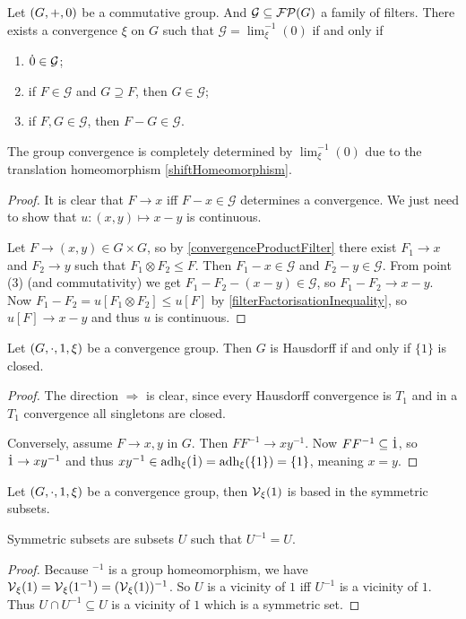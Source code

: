 \begin{proposition} \label{groupConvergenceConstruction}
Let $\left( G, +, 0 \right)$ be a commutative group. And $\mathcal{G} \subseteq \operatorname{\mathcal{FP}}(G)$ a family of filters. There exists a convergence $\xi$ on $G$ such that $\mathcal{G} = \lim^{-1}_\xi(0)$ \textup{if and only if}
\begin{enumerate}
\item $\dot{0} \in \mathcal{G}$;
\item if $F \in \mathcal{G}$ and $G\supseteq F$, then $G\in \mathcal{G}$;
\item if $F,G\in \mathcal{G}$, then $F - G\in \mathcal{G}$.
\end{enumerate}
\end{proposition}
The group convergence is completely determined by $\lim^{-1}_\xi(0)$ due to the translation homeomorphism \ref{shiftHomeomorphism}.
\begin{proof}
It is clear that $F \to x$ iff $F - x \in \mathcal{G}$ determines a convergence. We just need to show that $u: (x,y) \mapsto x - y$ is continuous.

Let $F \to (x,y) \in G\times G$, so by \ref{convergenceProductFilter} there exist $F_1\to x$ and $F_2 \to y$ such that $F_1\otimes F_2 \leq F$. Then $F_1 - x \in \mathcal{G}$ and $F_2 - y \in \mathcal{G}$. From point (3) (and commutativity) we get $F_1 - F_2 - (x - y) \in \mathcal{G}$, so $F_1 - F_2 \to x-y$. Now $F_1 - F_2 = u[F_1\otimes F_2] \leq u[F]$ by \ref{filterFactorisationInequality}, so $u[F] \to x-y$ and thus $u$ is continuous.
\end{proof}

\begin{proposition} \label{HausdorffCriterionConvergenceGroup}
Let $\left( G,\cdot, 1, \xi \right)$ be a convergence group. Then $G$ is Hausdorff \textup{if and only if} $\{1\}$ is closed.
\end{proposition}
\begin{proof}
The direction $\Rightarrow$ is clear, since every Hausdorff convergence is $T_1$ and in a $T_1$ convergence all singletons are closed.

Conversely, assume $F\to x,y$ in $G$. Then $FF^{-1} \to xy^{-1}$. Now $FF^{-1} \subseteq \dot{1}$, so $\dot{1} \to xy^{-1}$ and thus $xy^{-1}\in \operatorname{adh}_\xi(\dot{1}) = \operatorname{adh}_\xi(\{1\}) = \{1\}$, meaning $x = y$.
\end{proof}

\begin{lemma} \label{symmetricBase}
Let $\left( G,\cdot, 1, \xi \right)$ be a convergence group, then $\operatorname{\mathcal{V}}_\xi(1)$ is based in the symmetric subsets.
\end{lemma}
Symmetric subsets are subsets $U$ such that $U^{-1} = U$.
\begin{proof}
Because $^{-1}$ is a group homeomorphism, we have $\operatorname{\mathcal{V}}_\xi(1) = \operatorname{\mathcal{V}}_\xi(1^{-1}) = (\operatorname{\mathcal{V}}_\xi(1))^{-1}$. So $U$ is a vicinity of $1$ iff $U^{-1}$ is a vicinity of $1$. Thus $U\cap U^{-1}\subseteq U$ is a vicinity of $1$ which is a symmetric set.
\end{proof}

